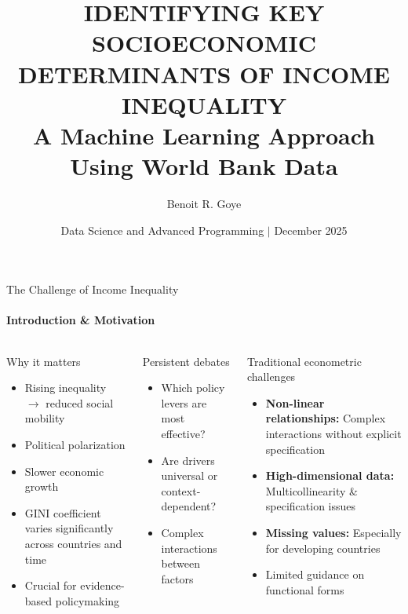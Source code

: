 \documentclass[aspectratio=169,8pt]{beamer}
\title[Data Science and Advanced Programming] %
{\large IDENTIFYING KEY SOCIOECONOMIC DETERMINANTS OF INCOME INEQUALITY\\ A Machine Learning Approach Using World Bank Data} %
\author{Benoit R. Goye}
\date[December 2025]  %
{Data Science and Advanced Programming \(|\) December 2025} %
\begin{document}
    \begin{frame}[plain]
        \titlepage{}
    \end{frame}

    \begin{frame}{The Challenge of Income Inequality}
        \framesubtitle{Introduction \& Motivation}
        \begin{columns}[totalwidth=\textwidth,T]
            \begin{block}{Why it matters}
                \begin{itemize}
                    \item Rising inequality $\rightarrow$ reduced social mobility
                    \item Political polarization
                    \item Slower economic growth
                    \item GINI coefficient varies significantly across countries and time
                    \item Crucial for evidence-based policymaking
                \end{itemize}
            \end{block}

            \vspace{0.1cm}
            \begin{exampleblock}{Persistent debates}
                \begin{itemize}
                    \item Which policy levers are most effective?
                    \item Are drivers universal or context-dependent?
                    \item Complex interactions between factors
                \end{itemize}
            \end{exampleblock}

            \begin{block}{Traditional econometric challenges}
                \begin{itemize}
                    \item \textbf{Non-linear relationships:} Complex interactions without explicit specification
                    \item \textbf{High-dimensional data:} Multicollinearity \& specification issues
                    \item \textbf{Missing values:} Especially for developing countries
                    \item Limited guidance on functional forms
                \end{itemize}
            \end{block}


\end{columns}
\end{frame}
\end{document}
